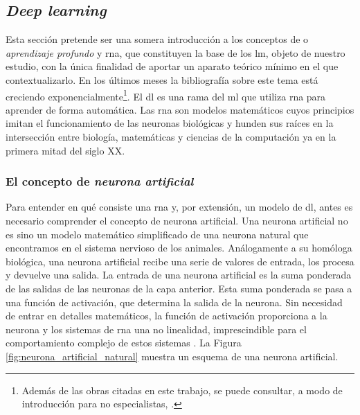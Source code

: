 \subsection{\emph{Deep learning}}

Esta sección pretende ser una somera introducción a los conceptos de  o \emph{aprendizaje profundo} y \gls{rna}, que constituyen la base de los \gls{lm}, objeto de nuestro estudio, con la única finalidad de aportar un aparato teórico mínimo en el que contextualizarlo. En los últimos meses la bibliografía sobre este tema está creciendo exponencialmente\footnote{Además de las obras citadas en este trabajo, se puede consultar, a modo de introducción para no especialistas, \cite{BeginnerGuideNeural}.}. El \gls{dl} es una rama del \gls{ml} que utiliza \gls{rna} para aprender de forma automática. Las \gls{rna} son modelos matemáticos cuyos principios imitan el funcionamiento de las neuronas biológicas y hunden sus raíces en la intersección entre biología, matemáticas y ciencias de la computación ya en la primera mitad del siglo XX.

\subsubsection{El concepto de \emph{neurona artificial}}

Para entender en qué consiste una \gls{rna} y, por extensión, un modelo de \gls{dl}, antes es necesario comprender el concepto de neurona artificial. Una neurona artificial no es sino un modelo matemático simplificado de una neurona natural que encontramos en el sistema nervioso de los animales. Análogamente a su homóloga biológica, una neurona artificial recibe una serie de valores de entrada, los procesa y devuelve una salida. La entrada de una neurona artificial es la suma ponderada de las salidas de las neuronas de la capa anterior. Esta suma ponderada se pasa a una función de activación, que determina la salida de la neurona. Sin necesidad de entrar en detalles matemáticos, la función de activación proporciona a la neurona y los sistemas de \gls{rna} una no linealidad, imprescindible para el comportamiento complejo de estos sistemas \citep{torresivinalsPythonDeepLearning2020,zhang2023dive}. La Figura \ref{fig:neurona_artificial_natural} muestra un esquema de una neurona artificial.

